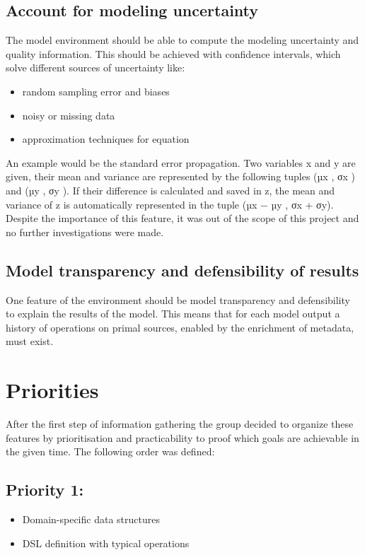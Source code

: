 \subsection{Account for modeling uncertainty}
\par
The model environment should be able to compute the modeling uncertainty and quality information. This should be achieved with confidence intervals, which solve different sources of uncertainty like:
\begin{itemize}
	\item random sampling error and biases
	\item noisy or missing data
	\item approximation techniques for equation
\end{itemize}
\par
An example would be the standard error propagation. Two variables x and y are given, their mean and variance are represented by the following tuples (µx , σx ) and (µy , σy ). If their difference is calculated and saved in z, the mean and variance of z is automatically represented in the tuple  (µx − µy , σx + σy).
\\
Despite the importance of this feature, it was out of the scope of this project and no further investigations were made.

\subsection{Model transparency and defensibility of results}
One feature of the environment should be model transparency and defensibility  to explain the results of the model. This means that for each model output a history of operations on primal sources, enabled by the enrichment of metadata, must exist.

\section{Priorities}
\par
After the first step of information gathering the group decided to organize these features by prioritisation and practicability to proof which goals are achievable in the given time.  
The following order was defined:
\subsection*{Priority 1:}
\begin{itemize}
	\item Domain-specific data structures
	\item DSL definition with typical operations
\end{itemize}
